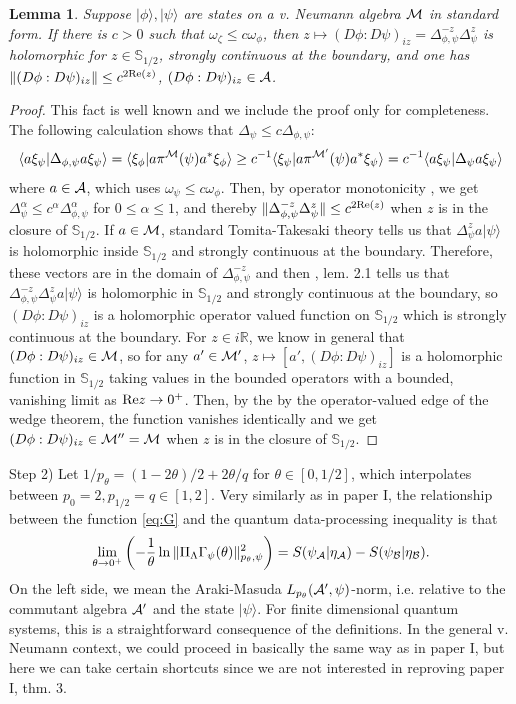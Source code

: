 \documentclass[english,a4paper,12pt]{article}
\newtheorem{lemma}{Lemma}
\def\bS{{\mathbb S}}
\def\cA{{\mathfrak A}}
\def\cB{{\mathfrak B}}
\def\cM{{\mathfrak M}}
\newcommand{\ca}[1]{{\cal #1}}
\newcommand{\ben}{\begin{equation}}
\newcommand{\een}{\end{equation}}
\def\cA{{\ca A}}
\def\cB{{\ca B}}
\def\cM{{\ca M}}
\renewcommand{\log}{\operatorname{ln}}
\newcommand{\RR}{\mathbb{R}}
\renewcommand{\Re}{{\rm Re}}
\begin{document}
\begin{lemma}\label{lem:2}
Suppose $|\phi\rangle, |\psi\rangle$ are states on a v. Neumann algebra $\cM$ in standard form. 
If there is $c>0$ such that $\omega_\zeta \le c \omega_\phi$, then $z \mapsto (D\phi:D\psi)_{iz}= \Delta_{\phi,\psi}^{-z} \Delta_{\psi}^{z}$
 is holomorphic for $z \in \bS_{1/2}$, strongly continuous at the boundary, and 
one has $\| (D\phi:D\psi)_{iz} \| \le c^{2\Re(z)}$, $(D\phi:D\psi)_{iz} \in \cA$.
\end{lemma}

\begin{proof}
This fact is well known and we include the proof only for completeness. 
The following calculation shows that $\Delta_{\psi} \le c \Delta_{\phi,\psi}$:
\ben
\langle a \xi_\psi | \Delta_{\phi,\psi} a \xi_\psi \rangle = \langle \xi_\phi | a \pi^\cM(\psi) a^* \xi_\phi \rangle \ge c^{-1} \langle \xi_\psi | a \pi^{\cM'}(\psi) a^* \xi_\psi \rangle 
=c^{-1} \langle a \xi_\psi | \Delta_\psi a \xi_\psi \rangle
\een
where $a \in \cA$, which uses $\omega_\psi \le c\omega_\phi$. Then, by operator monotonicity  \cite{Hansen}, we get $\Delta_\psi^\alpha \le c^\alpha \Delta_{\phi,\psi}^\alpha$
for $0 \le \alpha \le 1$, and thereby $\| \Delta_{\phi,\psi}^{-z} \Delta_{\psi}^{z} \| \le c^{2\Re(z)}$ when $z$ is in the closure of $\bS_{1/2}$. If $a \in \cM$, 
standard Tomita-Takesaki theory tells us that $\Delta_{\psi}^{z} a |\psi\rangle$ is holomorphic inside $\bS_{1/2}$ and strongly continuous
at the boundary. Therefore, these vectors are in the domain of  $\Delta_{\phi,\psi}^{-z}$ and then \cite{CecchiniPetz}, lem. 2.1 tells 
us that $\Delta_{\phi,\psi}^{-z} \Delta_{\psi}^{z} a |\psi\rangle$ is holomorphic in $\bS_{1/2}$ and strongly continuous at the boundary, so 
$(D\phi:D\psi)_{iz}$ is a holomorphic operator valued function on $\bS_{1/2}$ which is strongly continuous at the boundary. 
For $z \in i\RR$, 
we know in general that $(D\phi:D\psi)_{iz} \in \cM$, so for any $a' \in \cM'$, $z \mapsto [a', (D\phi:D\psi)_{iz}]$ is a holomorphic 
function in $\bS_{1/2}$ taking values in the bounded operators with a bounded, vanishing limit as $\Re z \to 0^+$. Then, by the by the operator-valued 
edge of the wedge theorem, the function vanishes identically and we get $(D\phi:D\psi)_{iz} \in \cM''=\cM$ when $z$ is in the closure of $\bS_{1/2}$. 
\end{proof}

Step 2)
Let $1/p_\theta=(1-2\theta)/2+2\theta/q$ for $\theta \in [0,1/2]$, which interpolates between $p_0=2,p_{1/2}=q \in [1,2]$. Very similarly as in paper I, the relationship between the function \eqref{eq:G} and the 
quantum data-processing inequality is that  
\ben
\label{eq:limit}
\lim_{\theta \to 0^+} \left( -\frac{1}{\theta} \log \| \Pi_\Lambda \Gamma_\psi(\theta) \|_{p_\theta,\psi}^2 \right) = S(\psi_\cA | \eta_\cA) - S(\psi_\cB | \eta_\cB). 
\een
On the left side, we mean the Araki-Masuda $L_{p_\theta}(\cA',\psi)$-norm, i.e. relative to the commutant algebra $\cA'$ and the state $|\psi\rangle$.
For finite dimensional quantum systems, this is a straightforward consequence of the definitions. In the general v. Neumann context, we could proceed 
in basically the same way as in paper I, but here we can take certain shortcuts since we are not interested in reproving paper I, thm. 3. 
\end{document}
